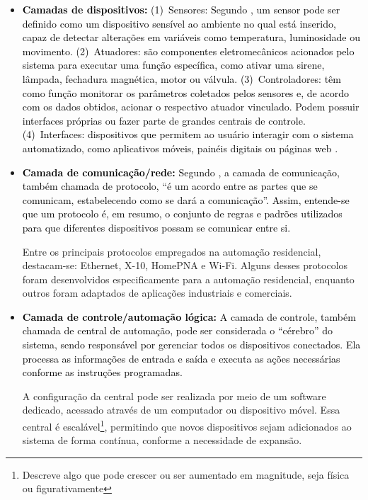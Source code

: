             \begin{itemize}
                \item \textbf{\textcolor{black}{Camadas de dispositivos:}} \textcolor{black}{(1)~Sensores: Segundo \cite{hipolito2018automaccao}, um sensor pode ser definido como um dispositivo sensível ao ambiente no qual está inserido, capaz de detectar alterações em variáveis como temperatura, luminosidade ou movimento. (2)~Atuadores: são componentes eletromecânicos acionados pelo sistema para executar uma função específica, como ativar uma sirene, lâmpada, fechadura magnética, motor ou válvula. (3)~Controladores: têm como função monitorar os parâmetros coletados pelos sensores e, de acordo com os dados obtidos, acionar o respectivo atuador vinculado. Podem possuir interfaces próprias ou fazer parte de grandes centrais de controle. (4)~Interfaces: dispositivos que permitem ao usuário interagir com o sistema automatizado, como aplicativos móveis, painéis digitais ou páginas web \cite{accardi2012automaccao}.}
                
                \item \textbf{\textcolor{black}{Camada de comunicação/rede:}} \textcolor{black}{Segundo \cite{accardi2012automaccao}, a camada de comunicação, também chamada de protocolo, “é um acordo entre as partes que se comunicam, estabelecendo como se dará a comunicação”. Assim, entende-se que um protocolo é, em resumo, o conjunto de regras e padrões utilizados para que diferentes dispositivos possam se comunicar entre si.}
                
                Entre os principais protocolos empregados na automação residencial, destacam-se: Ethernet, X-10, HomePNA e Wi-Fi. Alguns desses protocolos foram desenvolvidos especificamente para a automação residencial, enquanto outros foram adaptados de aplicações industriais e comerciais.
                
                \item \textbf{\textcolor{black}{Camada de controle/automação lógica:}} \textcolor{black}{A camada de controle, também chamada de central de automação, pode ser considerada o “cérebro” do sistema, sendo responsável por gerenciar todos os dispositivos conectados. Ela processa as informações de entrada e saída e executa as ações necessárias conforme as instruções programadas.}
                
                A configuração da central pode ser realizada por meio de um software dedicado, acessado através de um computador ou dispositivo móvel. Essa central é escalável\footnote{Descreve algo que pode crescer ou ser aumentado em magnitude, seja física ou figurativamente}, permitindo que novos dispositivos sejam adicionados ao sistema de forma contínua, conforme a necessidade de expansão.
        
            \end{itemize}
    

